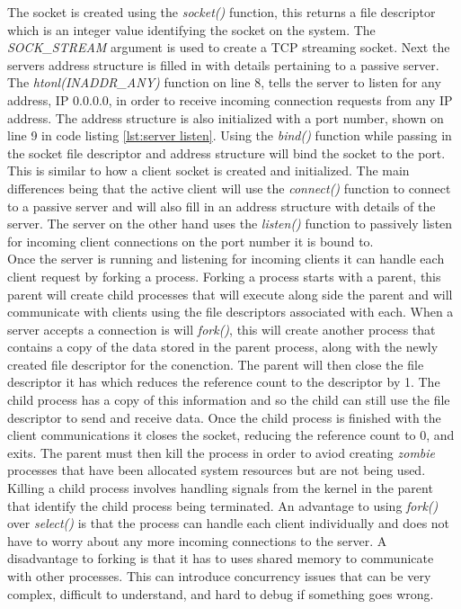 \documentclass[12pt,a4paper,titlepage]{article}
\begin{document}
The socket is created using the \textit{socket()} function, this returns a file descriptor which is an integer value identifying the socket on the system. The \textit{SOCK\_STREAM} argument is used to create a TCP streaming socket. Next the servers address structure is filled in with details pertaining to a passive server. The \textit{htonl(INADDR\_ANY)} function on line 8, tells the server to listen for any address, IP 0.0.0.0, in order to receive incoming connection requests from any IP address. The address structure is also initialized with a port number, shown on line 9 in code listing \ref{lst:server listen}. Using the \textit{bind()} function while passing in the socket file descriptor and address structure will bind the socket to the port.\\ 

This is similar to how a client socket is created and initialized. The main differences being that the active client will use the \textit{connect()} function to connect to a passive server and will also fill in an address structure with details of the server. The server on the other hand uses the \textit{listen()} function to passively listen for incoming client connections on the port number it is bound to. \\

Once the server is running and listening for incoming clients it can handle each client request by forking a process. Forking a process starts with a parent, this parent will create child processes that will execute along side the parent and will communicate with clients using the file descriptors associated with each. When a server accepts a connection is will \textit{fork()}, this will create another process that contains a copy of the data stored in the parent process, along with the newly created file descriptor for the conenction. The parent will then close the file descriptor it has which reduces the reference count to the descriptor by 1. The child process has a copy of this information and so the child can still use the file descriptor to send and receive data. Once the child process is finished with the client communications it closes the socket, reducing the reference count to 0, and exits. The parent must then kill the process in order to aviod creating \textit{zombie} processes that have been allocated system resources but are not being used. Killing a child process involves handling signals from the kernel in the parent that identify the child process being terminated. An advantage to using \textit{fork()} over \textit{select()} is that the process can handle each client individually and does not have to worry about any more incoming connections to the server. A disadvantage to forking is that it has to uses shared memory to communicate with other processes. This can introduce concurrency issues that can be very complex, difficult to understand, and hard to debug if something goes wrong.\\
\end{document}
